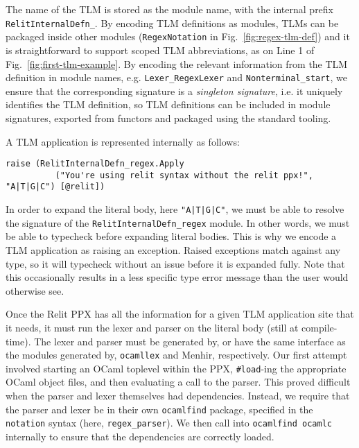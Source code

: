 \documentclass[acmsmall,review]{acmart}
\newcommand{\li}[1]{\lstinline[basicstyle=\ttfamily\fontsize{9pt}{1em}\selectfont]{#1}}
\theoremstyle{slplain}
\numberwithin{thm}{section}
\begin{document}
The name of the TLM is stored as the module name, with the internal prefix \li{RelitInternalDefn_}. By encoding TLM definitions as modules, TLMs can be packaged inside other modules (\li{RegexNotation} in Fig.~\ref{fig:regex-tlm-def}) and it is straightforward to support scoped TLM abbreviations, as on Line 1 of Fig.~\ref{fig:first-tlm-example}. By encoding the relevant information from the TLM definition in module names, e.g. \li{Lexer_RegexLexer} and \li{Nonterminal_start}, we ensure that the corresponding signature is a \emph{singleton signature}, i.e. it uniquely identifies the TLM definition, so TLM definitions can be included in module signatures, exported from functors and packaged using the standard tooling.

A TLM application is represented internally as follows:
\begin{lstlisting}[numbers=none]
  raise (RelitInternalDefn_regex.Apply
          ("You're using relit syntax without the relit ppx!", "A|T|G|C") [@relit])
\end{lstlisting}

In order to expand the literal body, here \li{"A|T|G|C"}, we must be able to resolve the signature of the \li{RelitInternalDefn_regex} module. In other words, we must be able to typecheck before expanding literal bodies. This is why we encode a TLM application as raising an exception. Raised exceptions match against any type, so it will typecheck without an issue before it is expanded fully. Note that this occasionally results in a less specific type error message than the user would otherwise see. 

Once the Relit PPX has all the information for a given TLM application site that it needs, it must run the lexer and parser on the literal body (still at compile-time).  The lexer and parser must be generated by, or have the same interface as the modules generated by, \li{ocamllex} and Menhir, respectively. Our first attempt involved starting an OCaml toplevel within the PPX, \li{#load}-ing the appropriate OCaml object files, and then evaluating a call to the parser. This proved difficult when the parser and lexer themselves had dependencies. Instead, we require that the parser and lexer be in their own \li{ocamlfind} package, specified in the \li{notation} syntax (here, \li{regex_parser}). We then call into \li{ocamlfind ocamlc} internally to ensure that the dependencies are correctly loaded.
\end{document}
